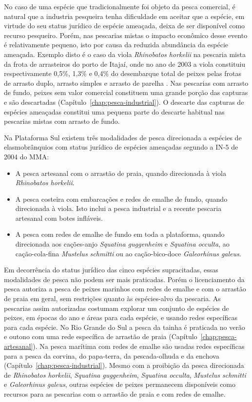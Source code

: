 \documentclass[a4paper,11pt,twoside,showtrims,onecolumn,openright,final]{memoir}
\begin{document}
No caso de uma espécie que tradicionalmente foi objeto da pesca comercial, é 
natural que a industria pesqueira tenha dificuldade em aceitar que a espécie, 
em virtude do seu status jurídico de espécie ameaçada, deixa de ser disponível como 
recurso pesqueiro. Porém, nas pescarias mistas o impacto econômico desse evento é 
relativamente pequeno,  isto por causa da reduzida abundância da espécie ameaçada. 
Exemplo disto é o caso da viola \emph{Rhinobatos horkelii} na pescaria mista da frota 
de arrasteiros do porto de Itajaí, onde no ano de 2003 a viola constituiu 
respectivamente 0,5\%, 1,3\% e 0,4\% do desembarque total de peixes pelas frotas 
de arrasto duplo, arrasto simples e arrasto de parelha \citep{univali2004}. %
Nas pescarias com arrasto de fundo, peixes sem valor comercial constituem uma 
grande porção das capturas e são descartadas (Capítulo~\ref{chap:pesca-industrial}). 
O descarte das capturas de espécies 
ameaçadas constitui uma pequena parte do descarte habitual 
nas pescarias mistas com arrasto de fundo.

Na Plataforma Sul existem três modalidades de pesca direcionada a espécies 
de elasmobrânquios com status jurídico de espécies ameaçadas segundo 
a IN-5 de 2004 do MMA:

\begin{itemize}
\item A pesca artesanal com o arrastão de praia, quando direcionada à viola \emph{Rhinobatos horkelii}. 
\item A pesca costeira com embarcações e redes de emalhe de fundo, quando  
      direcionada à viola. Isto inclui a pesca industrial e a recente pescaria 
      artesanal com botes infláveis. 
\item A pesca com redes de emalhe de fundo em toda a plataforma, quando direcionada 
      aos cações-anjo \emph{Squatina guggenheim} e \emph{Squatina occulta}, ao cação-cola-fina 
      \emph{Mustelus schmitti} ou ao cação-bico-doce \emph{Galeorhinus galeus}. 
\end{itemize}

Em decorrência do status jurídico das cinco espécies supracitadas, essas modalidades 
de pesca não podem ser mais praticadas. Porém o licenciamento da pesca autoriza a pesca 
de peixes marinhos com redes de emalhe e com o arrastão de praia em geral, sem restrições 
quanto às espécies-alvo da pescaria. As pescarias assim autorizadas costumam explorar um 
conjunto de espécies de peixes, em épocas do ano e áreas para cada espécie, e usando redes 
específicas para cada espécie. No Rio Grande do Sul a pesca da tainha é praticada no verão e outono 
com uma rede específica de arrastão de praia (Capítulo~\ref{chap:pesca-artesanal}). %
Na pesca marítima com redes de emalhe são usadas 
redes específicas para a pesca da corvina, do papa-terra, da pescada-olhuda e da enchova (Capítulo~\ref{chap:pesca-industrial}). %
Mesmo com a proibição da pesca direcionada de \emph{Rhinobatos horkelii}, \emph{Squatina guggenheim}, 
\emph{Squatina occulta},  \emph{Mustelus schmitti} e \emph{Galeorhinus galeus}, outras espécies de peixes 
permanecem disponíveis como recursos para as pescarias com o arrastão 
de praia e com redes de emalhe.
\end{document}

